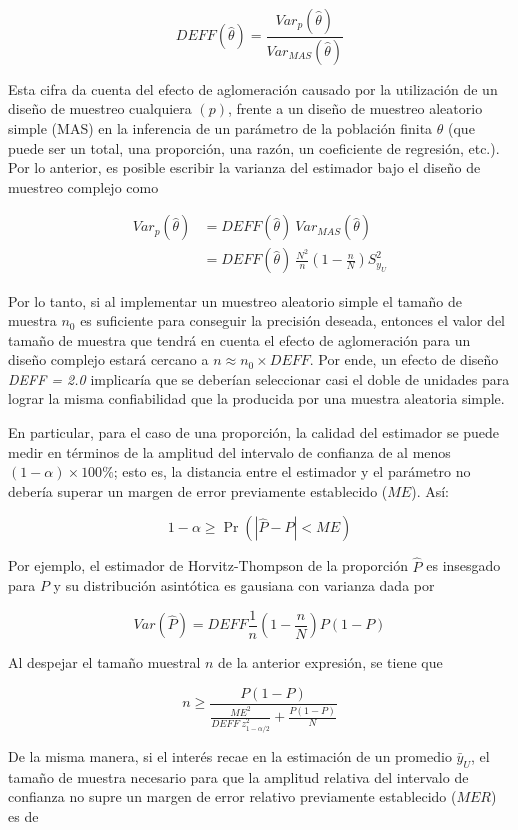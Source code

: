 \documentclass[
  12pt,
]{book}
\begin{document}
\[
DEFF(\hat{\theta})=\frac{Var_p(\hat{\theta})}{Var_{MAS}(\hat{\theta})}
\]

Esta cifra da cuenta del efecto de aglomeración causado por la utilización de un diseño de muestreo cualquiera \((p)\), frente a un diseño de muestreo aleatorio simple (MAS) en la inferencia de un parámetro de la población finita \(\theta\) (que puede ser un total, una proporción, una razón, un coeficiente de regresión, etc.). Por lo anterior, es posible escribir la varianza del estimador bajo el diseño de muestreo complejo como

\begin{align}
Var_p(\hat{\theta}) & = DEFF(\hat{\theta}) \ Var_{MAS}(\hat{\theta}) \\
& = DEFF(\hat{\theta}) \ \frac{N^2}{n}\left(1-\frac{n}{N}\right)S^2_{y_U}
\end{align}

Por lo tanto, si al implementar un muestreo aleatorio simple el tamaño de muestra \(n_0\) es suficiente para conseguir la precisión deseada, entonces el valor del tamaño de muestra que tendrá en cuenta el efecto de aglomeración para un diseño complejo estará cercano a \(n \approx  n_0 \times DEFF\). Por ende, un efecto de diseño \emph{DEFF = 2.0} implicaría que se deberían seleccionar casi el doble de unidades para lograr la misma confiabilidad que la producida por una muestra aleatoria simple.

En particular, para el caso de una proporción, la calidad del estimador se puede medir en términos de la amplitud del intervalo de confianza de al menos \((1-\alpha) \times 100\%\); esto es, la distancia entre el estimador y el parámetro no debería superar un margen de error previamente establecido (\(ME\)). Así:

\[
1-\alpha \geq \Pr\left(|\hat{P}-P|<ME\right)
\]

Por ejemplo, el estimador de Horvitz-Thompson de la proporción \(\hat{P}\) es insesgado para \(P\) y su distribución asintótica es gausiana con varianza dada por

\[
Var\left(\hat{P}\right)=DEFF\frac{1}{n}(1-\frac{n}{N})P(1-P)
\]

Al despejar el tamaño muestral \(n\) de la anterior expresión, se tiene que

\[
n\geq\frac{P(1-P)}{\frac{ME^2}{DEFF \ z_{1-\alpha/2}^2}+\frac{P(1-P)}{N}}
\]

De la misma manera, si el interés recae en la estimación de un promedio \(\bar{y}_U\), el tamaño de muestra necesario para que la amplitud relativa del intervalo de confianza no supre un margen de error relativo previamente establecido (\(MER\)) es de
\end{document}

